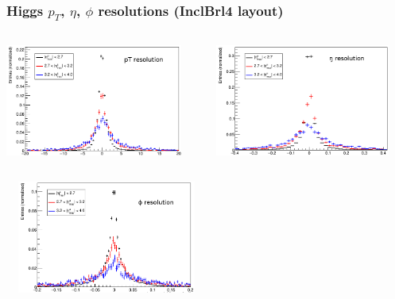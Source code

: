 \documentclass{beamer}
\begin{document}
\begin{frame}
\frametitle{Higgs $p_{T}$, $\eta$, $\phi$ resolutions (InclBrl4 layout)}
\begin{columns}
\begin{column}{0.5\textwidth}
\centering
\includegraphics[width=\textwidth,height=3.7cm]{HZZ4mu/sigRecoPt}
\end{column}
\begin{column}{0.5\textwidth}
\centering
\includegraphics[width=\textwidth,height=3.7cm]{HZZ4mu/sigRecoEta}
\end{column}
\end{columns}
\vskip-0.5cm
\begin{center}
\centering
\includegraphics[width=0.5\textwidth,height=3.7cm]{HZZ4mu/sigRecoPhi}
\end{center}

\end{frame}


\end{document}
